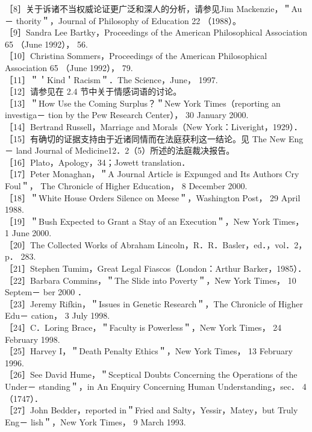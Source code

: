 ［8］关于诉诸不当权威论证更广泛和深人的分析，请参见Jim Mackenzie，＂Au－ thority＂，Journal of Philosophy of Education 22 （1988）。\\
［9］Sandra Lee Bartky，Proceedings of the American Philosophical Association 65 （June 1992）， 56.\\
［10］Christina Sommers，Proceedings of the American Philosophical Association 65 （June 1992）， 79.\\
［11］＂＇Kind＇Racism＂．The Science，June， 1997.\\
［12］请参见在 2.4 节中关于情感词语的讨论。\\
［13］＂How Use the Coming Surplus？＂New York Times（reporting an investiga－ tion by the Pew Research Center）， 30 January 2000.\\
［14］Bertrand Russell，Marriage and Morals（New York：Liveright，1929）．\\
［15］有确切的证据支持由于近诸同情而在法庭获利这一结论。见 The New Eng－ land Journal of Medicine12．2（5）所述的法庭裁决报告。\\
［16］Plato，Apology，34；Jowett translation．\\
［17］Peter Monaghan，＂A Journal Article is Expunged and Its Authors Cry Foul＂， The Chronicle of Higher Education， 8 December 2000.\\
［18］＂White House Orders Silence on Meese＂，Washington Post， 29 April 1988.\\
［19］＂Bush Expected to Grant a Stay of an Execution＂，New York Times， 1 June 2000.\\
［20］The Collected Works of Abraham Lincoln，R．R．Basler，ed．，vol．2，p． 283.\\
［21］Stephen Tumim，Great Legal Fiascos（London：Arthur Barker，1985）．\\
［22］Barbara Commins，＂The Slide into Poverty＂，New York Times， 10 Septem－ ber 2000 ．\\
［23］Jeremy Rifkin，＂Issues in Genetic Research＂，The Chronicle of Higher Edu－ cation， 3 July 1998.\\
［24］C．Loring Brace，＂Faculty is Powerless＂，New York Times， 24 February 1998.\\
［25］Harvey I，＂Death Penalty Ethics＂，New York Times， 13 February 1996.\\
［26］See David Hume，＂Sceptical Doubts Concerning the Operations of the Under－ standing＂，in An Enquiry Concerning Human Understanding，sec． 4 （1747）．\\
［27］John Bedder，reported in＂Fried and Salty，Yessir，Matey，but Truly Eng－ lish＂，New York Times， 9 March 1993.\\
